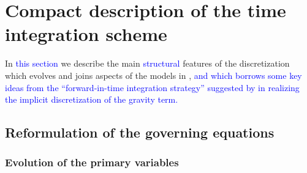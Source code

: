 \documentclass{ametsoc}
\theoremstyle{definition}
\newcommand{\klein}[1]{\textcolor{blue}{#1}}
\begin{document}
%
%


\section{Compact description of the time integration scheme}
\label{sec:TimeDiscretizationSummary}

In \klein{this section} we describe the main \klein{structural} features of the discretization which evolves and joins aspects of the models in \citep{KleinTCFD2009,BenacchioEtAl2014}, \klein{and which borrows some key ideas from the ``forward-in-time integration strategy'' suggested by \citet{SmolarkiewiczMargolin1997} in realizing the implicit discretization of the gravity term.} 


\subsection{Reformulation of the governing equations}
\label{ssec:Reformulation}


\subsubsection{Evolution of the primary variables}
\label{sssec:PrimaryVariables}
\end{document}

